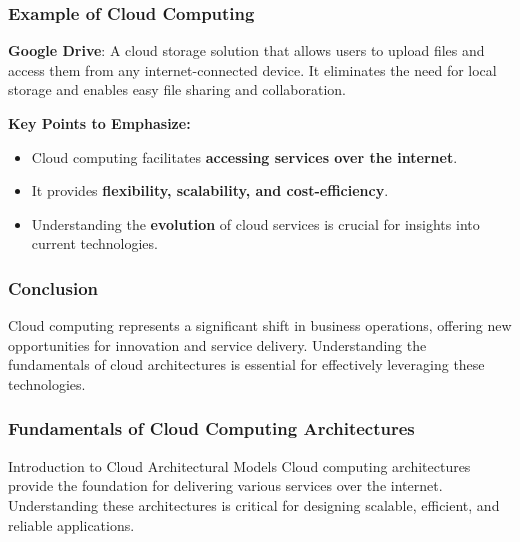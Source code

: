 \documentclass[aspectratio=169]{beamer}
\begin{document}
\begin{frame}[fragile]
    \frametitle{Example of Cloud Computing}
    \textbf{Google Drive}: A cloud storage solution that allows users to upload files and access them from any internet-connected device. It eliminates the need for local storage and enables easy file sharing and collaboration.
    
    \textbf{Key Points to Emphasize:}
    \begin{itemize}
        \item Cloud computing facilitates \textbf{accessing services over the internet}.
        \item It provides \textbf{flexibility, scalability, and cost-efficiency}.
        \item Understanding the \textbf{evolution} of cloud services is crucial for insights into current technologies.
    \end{itemize}
\end{frame}

\begin{frame}[fragile]
    \frametitle{Conclusion}
    Cloud computing represents a significant shift in business operations, offering new opportunities for innovation and service delivery. Understanding the fundamentals of cloud architectures is essential for effectively leveraging these technologies.
\end{frame}

\begin{frame}[fragile]
  \frametitle{Fundamentals of Cloud Computing Architectures}
  
  \begin{block}{Introduction to Cloud Architectural Models}
    Cloud computing architectures provide the foundation for delivering various services over the internet. Understanding these architectures is critical for designing scalable, efficient, and reliable applications.
  \end{block}
\end{frame}
\end{document}
